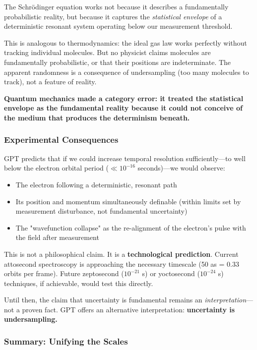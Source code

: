 \documentclass[12pt, a4paper]{article}
\begin{document}
The Schrödinger equation works not because it describes a fundamentally probabilistic reality, but because it captures the \textit{statistical envelope} of a deterministic resonant system operating below our measurement threshold.

This is analogous to thermodynamics: the ideal gas law works perfectly without tracking individual molecules. But no physicist claims molecules are fundamentally probabilistic, or that their positions are indeterminate. The apparent randomness is a consequence of undersampling (too many molecules to track), not a feature of reality.

\textbf{Quantum mechanics made a category error: it treated the statistical envelope as the fundamental reality because it could not conceive of the medium that produces the determinism beneath.}

\subsubsection{Experimental Consequences}
\label{subsec:atomic_experimental}

GPT predicts that if we could increase temporal resolution sufficiently—to well below the electron orbital period (\( \ll 10^{-16} \) seconds)—we would observe:

\begin{itemize}
    \item The electron following a deterministic, resonant path
    \item Its position and momentum simultaneously definable (within limits set by measurement disturbance, not fundamental uncertainty)
    \item The "wavefunction collapse" as the re-alignment of the electron's pulse with the field after measurement
\end{itemize}

This is not a philosophical claim. It is a \textbf{technological prediction}. Current attosecond spectroscopy is approaching the necessary timescale (50 as = 0.33 orbits per frame). Future zeptosecond (\( 10^{-21} \) s) or yoctosecond (\( 10^{-24} \) s) techniques, if achievable, would test this directly.

Until then, the claim that uncertainty is fundamental remains an \textit{interpretation}—not a proven fact. GPT offers an alternative interpretation: \textbf{uncertainty is undersampling.}

\subsubsection{Summary: Unifying the Scales}
\label{subsec:scales_summary}
\end{document}
